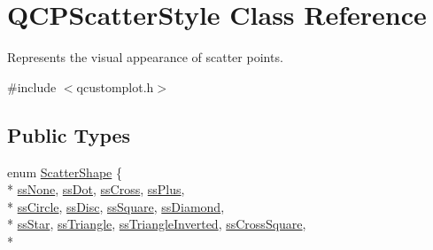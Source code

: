 \hypertarget{class_q_c_p_scatter_style}{\section{Q\-C\-P\-Scatter\-Style Class Reference}
\label{class_q_c_p_scatter_style}
}


Represents the visual appearance of scatter points.  




{\ttfamily \#include $<$qcustomplot.\-h$>$}

\subsection*{Public Types}
\begin{DoxyCompactItemize}
\item 
enum \hyperlink{class_q_c_p_scatter_style_adb31525af6b680e6f1b7472e43859349}{Scatter\-Shape} \{ \\*
\hyperlink{class_q_c_p_scatter_style_adb31525af6b680e6f1b7472e43859349abd144c291ca274f77053ec68cab6c022}{ss\-None}, 
\hyperlink{class_q_c_p_scatter_style_adb31525af6b680e6f1b7472e43859349a06e15a735b79093a1d999c0374fa3aa1}{ss\-Dot}, 
\hyperlink{class_q_c_p_scatter_style_adb31525af6b680e6f1b7472e43859349a9eacd60f059dc3ef71bf249f515a6fe4}{ss\-Cross}, 
\hyperlink{class_q_c_p_scatter_style_adb31525af6b680e6f1b7472e43859349a2d7f1d3c1a148b9d9d17f2fd9cae5eb7}{ss\-Plus}, 
\\*
\hyperlink{class_q_c_p_scatter_style_adb31525af6b680e6f1b7472e43859349a7c92a110880d0ef2170dff3a5b4f7779}{ss\-Circle}, 
\hyperlink{class_q_c_p_scatter_style_adb31525af6b680e6f1b7472e43859349a281fe1434696dcbab3aa6b9ccfbb09e9}{ss\-Disc}, 
\hyperlink{class_q_c_p_scatter_style_adb31525af6b680e6f1b7472e43859349a279e48703ddc9f1cf4a61d3e2817ab3c}{ss\-Square}, 
\hyperlink{class_q_c_p_scatter_style_adb31525af6b680e6f1b7472e43859349a4fc5929df1b2dad0a3cb2ef2c8b6e633}{ss\-Diamond}, 
\\*
\hyperlink{class_q_c_p_scatter_style_adb31525af6b680e6f1b7472e43859349a6047a2d64e41f1d6ce54445d595d442f}{ss\-Star}, 
\hyperlink{class_q_c_p_scatter_style_adb31525af6b680e6f1b7472e43859349a74a8d4eff1d97b57c53a60d0003453c3}{ss\-Triangle}, 
\hyperlink{class_q_c_p_scatter_style_adb31525af6b680e6f1b7472e43859349a6156274d21d8b4115197567d3ea2d9a8}{ss\-Triangle\-Inverted}, 
\hyperlink{class_q_c_p_scatter_style_adb31525af6b680e6f1b7472e43859349a7081310936c200c6c78e34c172f72d07}{ss\-Cross\-Square}, 
\\*

\end{DoxyCompactItemize}

